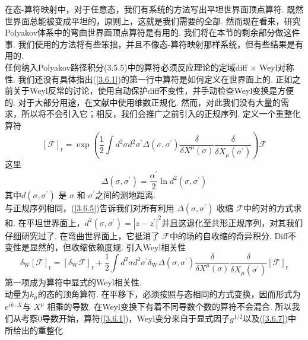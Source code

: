 在态-算符映射中，对于任意态，我们有系统的方法写出平坦世界面顶点算符. 既然世界面总能被变成平坦的，原则上，这就是我们需要的全部. 然而现在看来，研究Polyakov体系中的弯曲世界面顶点算符是有用的. 我们将在本节的剩余部分做这件事. 我们使用的方法将有些笨拙，并且不像态-算符映射那样系统，但有些结果是有用的.\\
任何纳入Polyakov路径积分(3.5.5)中的算符必须反应理论的定域diff $\times$ Weyl对称性. 我们还没有具体指出(\ref{3.6.1})的第一行中算符是如何定义在世界面上的. 正如之前关于Weyl反常的讨论，使用自动保护diff不变性，并手动检查Weyl变换是方便的. 对于大部分用途，在文献中使用维数正规化. 然而，对此我们没有大量的需求，所以将不会引入它；相反，我们会推广之前引入的正规序列. 定义一个重整化算符
\begin{equation}\label{3.6.5}
[\mathscr{F}]_{\mathrm{r}}=\exp \left(\frac{1}{2} \int d^{2} \sigma d^{2} \sigma^{\prime} \Delta\left(\sigma, \sigma^{\prime}\right) \frac{\delta}{\delta X^{\mu}(\sigma)} \frac{\delta}{\delta X_{\mu}\left(\sigma^{\prime}\right)}\right) \mathscr{F}
\end{equation}
这里
\begin{equation}
\Delta\left(\sigma, \sigma^{\prime}\right)=\frac{\alpha^{\prime}}{2} \ln d^{2}\left(\sigma, \sigma^{\prime}\right)
\end{equation}
其中$d\left(\sigma, \sigma^{\prime}\right)$ 是 $\sigma$ 和 $\sigma^{\prime}$之间的测地距离. \\
与正规序列相同，(\ref{3.6.5})告诉我们对所有利用 $\Delta\left(\sigma, \sigma^{\prime}\right) $ 收缩 $\mathscr{F}$中的对的方式求和. 在平坦世界面上，$d^{2}\left(\sigma, \sigma^{\prime}\right)=\left|z-z^{\prime}\right|^{2}$并且这退化至共形正规序列，对其我们仔细研究过了. 在弯曲世界面上，它抵消了 $\mathscr{F}$中的场的自收缩的奇异积分. Diff不变性是显然的，但收缩依赖度规. 引入Weyl相关性
\begin{equation}\label{3.6.7}
\delta_{\mathrm{W}}[\mathscr{F}]_{\mathrm{r}}=\left[\delta_{\mathrm{W}} \mathscr{F}\right]_{\mathrm{r}}+\frac{1}{2} \int d^{2} \sigma d^{2} \sigma^{\prime} \delta_{\mathrm{W}} \Delta\left(\sigma, \sigma^{\prime}\right) \frac{\delta}{\delta X^{\mu}(\sigma)} \frac{\delta}{\delta X_{\mu}\left(\sigma^{\prime}\right)}[\mathscr{F}]_{\mathrm{r}}
\end{equation}
第一项成为算符中显式的Weyl相关性.\\
动量为$k_\mu$的态的顶角算符. 在平移下，必须按照与态相同的方式变换，因而形式为$e^{ik\cdot X}$与 $X^\mu$ 相乘的导数.
在Weyl变换下有着不同导数个数的算符不会混合. 所以我们从考察0导数开始，算符(\ref{3.6.1})，Weyl变分来自于显式因子$g^{1/2}$以及(\ref{3.6.7})中所给出的重整化
